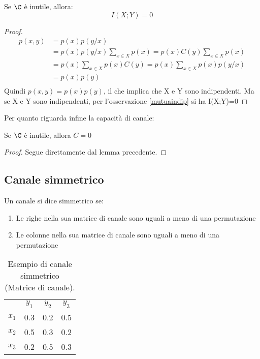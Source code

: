 \begin{lemma}
 Se $\C$ è inutile, allora:
\[
  I(X;Y)=0
\]
 \begin{proof}
\[\begin{split}
 p(x,y)&=p(x)p(y/x) \\
       &=p(x)p(y/x)\sum_{x \in X}p(x) 
       =p(x)C(y)\sum_{x \in X}p(x) \\
       &=p(x) \sum_{x \in X}p(x)C(y)
       =p(x) \sum_{x \in X}p(x)p(y/x)\\
       &=p(x) p(y) \\
  \end{split}
\]
Quindi $p(x,y)=p(x)p(y)$, il che implica che X e Y sono indipendenti.
Ma se X e Y sono indipendenti, per l'osservazione \ref{mutuaindip} si ha I(X;Y)=0
 \end{proof}
\end{lemma}

\noindent
Per quanto riguarda infine la capacità di canale:

\begin{lemma}
Se $\C$ è inutile, allora $C=0$
\begin{proof}
Segue direttamente dal lemma precedente.
\end{proof}
\end{lemma}

\subsection{Canale simmetrico}

\medskip

\begin{definizione}
 Un canale si dice simmetrico se:
 \begin{enumerate}
  \item Le righe nella sua matrice di canale sono uguali a meno di una permutazione
  \item Le colonne nella sua matrice di canale sono uguali a meno di una permutazione
 \end{enumerate}
\end{definizione}


\begin{table}[htbp]
  \begin{center}
   \begin{tabular}{c c c c}
	& $y_1$ & $y_2$ & $y_3$ \\
	$x_1$ & 0.3 & 0.2 & 0.5 \\ 
	$x_2$ & 0.5 & 0.3 & 0.2  \\ 
	$x_3$ & 0.2 & 0.5 & 0.3  \\ 
    \end{tabular}
  \caption{Esempio di canale simmetrico (Matrice di canale).}
  \label{tab:tsim}
  \end{center}
\end{table}

